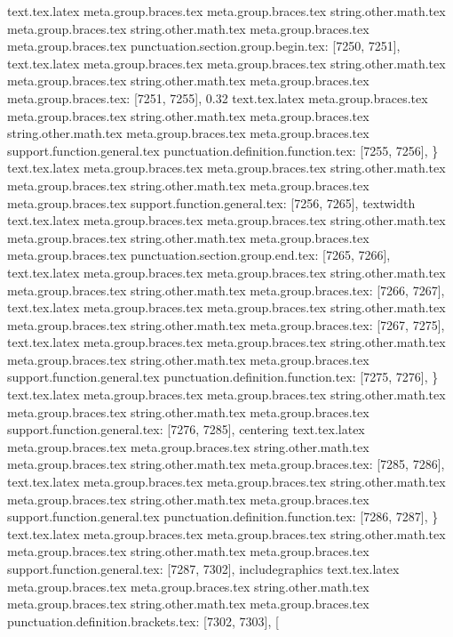 {{{{{{{{{{{{{{{{{{{{{{{{{{{{{{{{{{{{{{{{{{{{{{{{{{{{{{{{{{{{{{{{{{{{{{{{{{{{{{{{{{{{{{{{{{{{{{{{{{{{{{{{{{{{{{{{{{{{{{{{{{{{{{{{{{{{{{{{{{{{{{{{{{{{{{{{{{{{{{{{{{{{{{{{{{{{{{{{{{{{{{{{{{{{{{{{text.tex.latex meta.group.braces.tex meta.group.braces.tex string.other.math.tex meta.group.braces.tex string.other.math.tex meta.group.braces.tex meta.group.braces.tex punctuation.section.group.begin.tex: [7250, 7251], {{}
text.tex.latex meta.group.braces.tex meta.group.braces.tex string.other.math.tex meta.group.braces.tex string.other.math.tex meta.group.braces.tex meta.group.braces.tex: [7251, 7255], {0.32}
text.tex.latex meta.group.braces.tex meta.group.braces.tex string.other.math.tex meta.group.braces.tex string.other.math.tex meta.group.braces.tex meta.group.braces.tex support.function.general.tex punctuation.definition.function.tex: [7255, 7256], {\}
text.tex.latex meta.group.braces.tex meta.group.braces.tex string.other.math.tex meta.group.braces.tex string.other.math.tex meta.group.braces.tex meta.group.braces.tex support.function.general.tex: [7256, 7265], {textwidth}
text.tex.latex meta.group.braces.tex meta.group.braces.tex string.other.math.tex meta.group.braces.tex string.other.math.tex meta.group.braces.tex meta.group.braces.tex punctuation.section.group.end.tex: [7265, 7266], {}}
text.tex.latex meta.group.braces.tex meta.group.braces.tex string.other.math.tex meta.group.braces.tex string.other.math.tex meta.group.braces.tex: [7266, 7267], {
}
text.tex.latex meta.group.braces.tex meta.group.braces.tex string.other.math.tex meta.group.braces.tex string.other.math.tex meta.group.braces.tex: [7267, 7275], {        }
text.tex.latex meta.group.braces.tex meta.group.braces.tex string.other.math.tex meta.group.braces.tex string.other.math.tex meta.group.braces.tex support.function.general.tex punctuation.definition.function.tex: [7275, 7276], {\}
text.tex.latex meta.group.braces.tex meta.group.braces.tex string.other.math.tex meta.group.braces.tex string.other.math.tex meta.group.braces.tex support.function.general.tex: [7276, 7285], {centering}
text.tex.latex meta.group.braces.tex meta.group.braces.tex string.other.math.tex meta.group.braces.tex string.other.math.tex meta.group.braces.tex: [7285, 7286], { }
text.tex.latex meta.group.braces.tex meta.group.braces.tex string.other.math.tex meta.group.braces.tex string.other.math.tex meta.group.braces.tex support.function.general.tex punctuation.definition.function.tex: [7286, 7287], {\}
text.tex.latex meta.group.braces.tex meta.group.braces.tex string.other.math.tex meta.group.braces.tex string.other.math.tex meta.group.braces.tex support.function.general.tex: [7287, 7302], {includegraphics}
text.tex.latex meta.group.braces.tex meta.group.braces.tex string.other.math.tex meta.group.braces.tex string.other.math.tex meta.group.braces.tex punctuation.definition.brackets.tex: [7302, 7303], {[}
}}}}}}}}}}}}}}}}}}}}}}}}}}}}}}}}}}}}}}}}}}}}}}}}}}}}}}}}}}}}}}}}}}}}}}}}}}}}}}}}}}}}}}}}}}}}}}}}}}}}}}}}}}}}}}}}}}}}}}}}}}}}}}}}}}}}}}}}}}}}}}}}}}}}}}}}}}}}}}}}}}}}}}}}}}}}}}}}}}}}}}}}}}}}}}}}}}}
